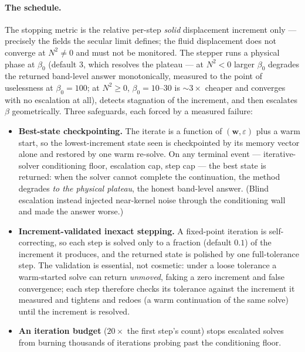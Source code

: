 \documentclass[11pt]{article}
\newcommand{\eps}{\varepsilon}
\newcommand{\bw}{\mathbf{w}}
\begin{document}
\paragraph{The schedule.} The stopping metric is the relative
per-step \emph{solid} displacement increment only --- precisely the
fields the secular limit defines; the fluid displacement does not
converge at $N^2 \ne 0$ and must not be monitored. The stepper runs
a physical phase at $\beta_0$ (default $3$, which resolves the
plateau --- at $N^2 < 0$ larger $\beta_0$ degrades the returned
band-level answer monotonically, measured to the point of
uselessness at $\beta_0 = 100$; at $N^2 \ge 0$, $\beta_0 = 10$--$30$
is $\sim 3\times$ cheaper and converges with no escalation at all),
detects stagnation of the increment, and then escalates $\beta$
geometrically. Three safeguards, each forced by a measured failure:
\begin{itemize}
\item \textbf{Best-state checkpointing.} The iterate is a function
  of $(\bw, \eps)$ plus a warm start, so the lowest-increment state
  seen is checkpointed by its memory vector alone and restored by
  one warm re-solve. On any terminal event --- iterative-solver
  conditioning floor, escalation cap, step cap --- the best state is
  returned: when the solver cannot complete the continuation, the
  method degrades \emph{to the physical plateau}, the honest
  band-level answer. (Blind escalation instead injected near-kernel
  noise through the conditioning wall and made the answer worse.)
\item \textbf{Increment-validated inexact stepping.} A fixed-point
  iteration is self-correcting, so each step is solved only to a
  fraction (default $0.1$) of the increment it produces, and the
  returned state is polished by one full-tolerance step. The
  validation is essential, not cosmetic: under a loose tolerance a
  warm-started solve can return \emph{unmoved}, faking a zero
  increment and false convergence; each step therefore checks its
  tolerance against the increment it measured and tightens and
  redoes (a warm continuation of the same solve) until the increment
  is resolved.
\item \textbf{An iteration budget} ($20\times$ the first step's
  count) stops escalated solves from burning thousands of iterations
  probing past the conditioning floor.
\end{itemize}
\end{document}
